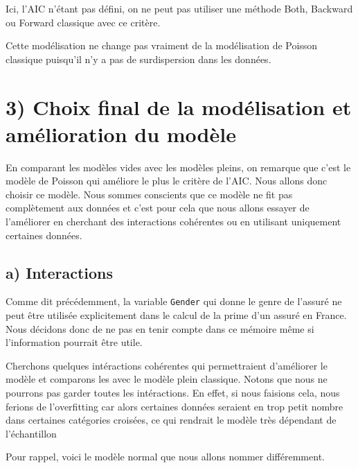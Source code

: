 \documentclass[
]{article}
\begin{document}
Ici, l'AIC n'étant pas défini, on ne peut pas utiliser une méthode Both,
Backward ou Forward classique avec ce critère.

Cette modélisation ne change pas vraiment de la modélisation de Poisson
classique puisqu'il n'y a pas de surdispersion dans les données.

\hypertarget{choix-final-de-la-moduxe9lisation-et-amuxe9lioration-du-moduxe8le}{%
\section{3) Choix final de la modélisation et amélioration du
modèle}\label{choix-final-de-la-moduxe9lisation-et-amuxe9lioration-du-moduxe8le}}

En comparant les modèles vides avec les modèles pleins, on remarque que
c'est le modèle de Poisson qui améliore le plus le critère de l'AIC.
Nous allons donc choisir ce modèle. Nous sommes conscients que ce modèle
ne fit pas complètement aux données et c'est pour cela que nous allons
essayer de l'améliorer en cherchant des interactions cohérentes ou en
utilisant uniquement certaines données.

\hypertarget{a-interactions}{%
\subsection{a) Interactions}\label{a-interactions}}

Comme dit précédemment, la variable \texttt{Gender} qui donne le genre
de l'assuré ne peut être utilisée explicitement dans le calcul de la
prime d'un assuré en France. Nous décidons donc de ne pas en tenir
compte dans ce mémoire même si l'information pourrait être utile.

Cherchons quelques intéractions cohérentes qui permettraient d'améliorer
le modèle et comparons les avec le modèle plein classique. Notons que
nous ne pourrons pas garder toutes les intéractions. En effet, si nous
faisions cela, nous ferions de l'overfitting car alors certaines données
seraient en trop petit nombre dans certaines catégories croisées, ce qui
rendrait le modèle très dépendant de l'échantillon

Pour rappel, voici le modèle normal que nous allons nommer différemment.
\end{document}
